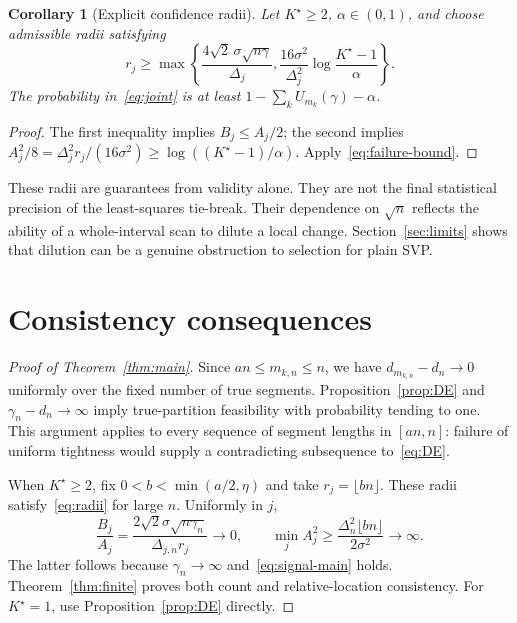 \documentclass[pdflatex,sn-mathphys-num]{sn-jnl}
\theoremstyle{thmstyleone}
\newtheorem{corollary}[theorem]{Corollary}
\theoremstyle{thmstyletwo}
\begin{document}
\begin{corollary}[Explicit confidence radii]\label{cor:radii}
Let $K^\star\ge2$, $\alpha\in(0,1)$, and choose admissible radii satisfying
\begin{equation}\label{eq:confidence-radii}
r_j\ge\max\left\{
\frac{4\sqrt{2}\,\sigma\sqrt{n\gamma}}{\Delta_j},
\frac{16\sigma^2}{\Delta_j^2}\log\frac{K^\star-1}{\alpha}
\right\}.
\end{equation}
The probability in~\eqref{eq:joint} is at least
$1-\sum_kU_{m_k}(\gamma)-\alpha$.
\end{corollary}
\begin{proof}
The first inequality implies $B_j\le A_j/2$; the second implies
$A_j^2/8=\Delta_j^2r_j/(16\sigma^2)\ge\log((K^\star-1)/\alpha)$.
Apply~\eqref{eq:failure-bound}.
\end{proof}

These radii are guarantees from validity alone. They are not the final
statistical precision of the least-squares tie-break. Their dependence on
$\sqrt n$ reflects the ability of a whole-interval scan to dilute a local
change. Section~\ref{sec:limits} shows that dilution can be a genuine
obstruction to selection for plain SVP.

\section{Consistency consequences}\label{sec:consequences}

\begin{proof}[Proof of Theorem~\ref{thm:main}]
Since $an\le m_{k,n}\le n$, we have $d_{m_{k,n}}-d_n\to0$ uniformly over the
fixed number of true segments. Proposition~\ref{prop:DE} and
$\gamma_n-d_n\to\infty$ imply true-partition feasibility with probability
tending to one. This argument applies to every sequence of segment lengths
in $[an,n]$: failure of uniform tightness would supply a contradicting
subsequence to~\eqref{eq:DE}.

When $K^\star\ge2$, fix $0<b<\min(a/2,\eta)$ and take $r_j=\lfloor bn\rfloor$.
These radii satisfy~\eqref{eq:radii} for large $n$.
Uniformly in $j$,
\[
\frac{B_j}{A_j}=\frac{2\sqrt{2}\sigma\sqrt{n\gamma_n}}{\Delta_{j,n}r_j}
\longrightarrow0,
\qquad
\min_j A_j^2\ge\frac{\Delta_n^2\lfloor bn\rfloor}{2\sigma^2}\longrightarrow\infty.
\]
The latter follows because $\gamma_n\to\infty$ and~\eqref{eq:signal-main} holds.
Theorem~\ref{thm:finite} proves both count and relative-location consistency.
For $K^\star=1$, use Proposition~\ref{prop:DE} directly.
\end{proof}
\end{document}
